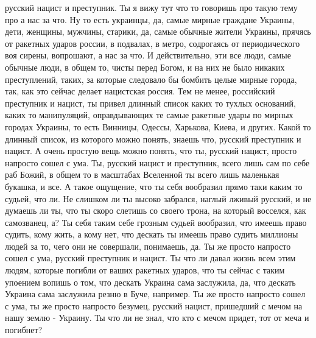  
 
 
 
 

русский нацист и преступник. Ты я вижу тут что то говоришь про такую тему про а
нас за что.  Ну то есть украинцы, да, самые мирные граждане Украины, дети,
женщины, мужчины, старики, да, самые обычные жители Украины, прячясь от
ракетных ударов россии, в подвалах, в метро, содрогаясь от периодического воя
сирены, вопрошают, а нас за что. И действительно, эти все люди, самые обычные
люди, в общем то, чисты перед Богом, и на них не было никаких преступлений,
таких, за которые следовало бы бомбить целые мирные города, так, как это сейчас
делает нацистская россия.  Тем не менее, российский преступник и нацист, ты
привел длинный список каких то тухлых оснований, каких то манипуляций,
оправдывающих те самые ракетные удары по мирных городах Украины, то есть
Винницы, Одессы, Харькова, Киева, и других. Какой то длинный список, из
которого можно понять, знаешь что, русский преступник и нацист.  А очень
простую вещь можно понять, что ты, русский нацист, просто напросто сошел с ума.
Ты, русский нацист и преступник, всего лишь сам по себе раб Божий, в общем то в
масштабах Вселенной ты всего лишь маленькая букашка, и все.  А такое ощущение,
что ты себя вообразил прямо таки каким то судьей, что ли. Не слишком ли ты
высоко забрался, наглый лживый русский, и не думаешь ли ты, что ты скоро
слетишь со своего трона, на который восселся, как самозванец, а?  Ты себя таким
себе грозным судьей вообразил, что имеешь право судить, кому жить, а кому нет,
что дескать ты имеешь право судить миллионы людей за то, чего они не совершали,
понимаешь, да. Ты же просто напросто сошел с ума, русский преступник и нацист.
Ты что ли давал жизнь всем этим людям, которые погибли от ваших ракетных
ударов, что ты сейчас с таким упоением вопишь о том, что дескать Украина сама
заслужила, да, что дескать Украина сама заслужила резню в Буче, например. Ты же
просто напросто сошел с ума, ты же просто напросто безумец, русский нацист,
пришедший с мечом на нашу землю - Украину. Ты что ли не знал, что кто с мечом
придет, тот от меча и погибнет? 
